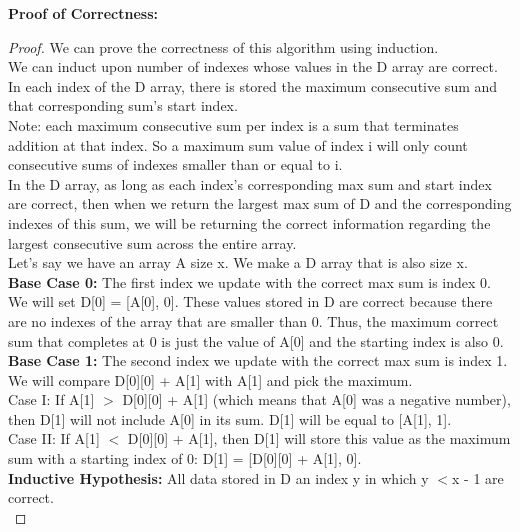 \documentclass[11pt, solution, letterpaper]{format}
\begin{document}
\textbf{Proof of Correctness:}\\
\begin{proof}
We can prove the correctness of this algorithm using induction.\\

We can induct upon number of indexes whose values in the D array are correct. In each index of the D array, there is stored the maximum consecutive sum and that corresponding sum's start index.\\

Note: each maximum consecutive sum per index is a sum that terminates addition at that index. So a maximum sum value of index i will only count consecutive sums of indexes smaller than or equal to i.\\

In the D array, as long as each index's corresponding max sum and start index are correct, then when we return the largest max sum of D and the corresponding indexes of this sum, we will be returning the correct information regarding the largest consecutive sum across the entire array.  \\

Let's say we have an array A size x. We make a D array that is also size x.\\

\textbf{Base Case 0:} The first index we update with the correct max sum is index 0. We will set D[0] = [A[0], 0]. These values stored in D are correct because there are no indexes of the array that are smaller than 0. Thus, the maximum correct sum that completes at 0 is just the value of A[0] and the starting index is also 0.\\ 

\textbf{Base Case 1:} The second index we update with the correct max sum is index 1. We will compare D[0][0] + A[1] with A[1] and pick the maximum. \\
Case I: If A[1] $>$ D[0][0] + A[1] (which means that A[0] was a negative number), then D[1] will not include A[0] in its sum. D[1] will be equal to [A[1], 1].\\

Case II: If A[1] $<$ D[0][0] + A[1], then D[1] will store this value as the maximum sum with a starting index of 0: D[1] = [D[0][0] + A[1], 0].\\

\textbf{Inductive Hypothesis:} All data stored in D an index y in which y $< $x - 1 are correct.\\


\end{proof}
\end{document}
